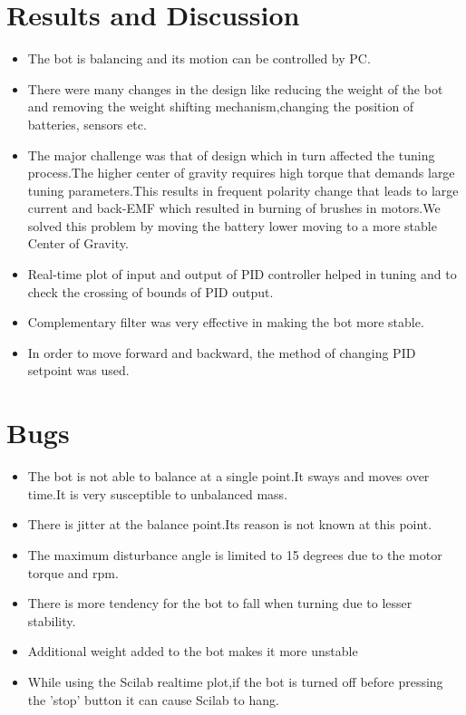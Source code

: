 \documentclass[report]{res}
\begin{document}
	
	\section{\large Results and Discussion}
	\begin{itemize}
		\item The bot is balancing and its motion can be controlled by PC.
		\item There were many changes in the design like reducing the weight of the bot and removing the weight shifting mechanism,changing the position of batteries, sensors etc.
		\item The major challenge was that of design which in turn affected the tuning process.The higher center of gravity requires high torque that demands large tuning parameters.This results in frequent polarity change that leads to large current and back-EMF which resulted in burning of brushes in motors.We solved this problem by moving the battery lower moving to a more stable Center of Gravity. 
		\item Real-time plot of input and output of PID controller helped in tuning and to check the crossing of bounds of PID output.
		\item Complementary filter was very effective in making the bot more stable.
		\item In order to move forward and backward, the method of changing PID setpoint was used.
	\end{itemize}
	
	
	\section{\large Bugs}
	\begin{itemize}
		\item The bot is not able to balance at a single point.It sways and moves over time.It is very susceptible to unbalanced mass.
		\item There is jitter at the balance point.Its reason is not known at this point.
		\item The maximum disturbance angle is limited to 15 degrees due to the motor torque and rpm.
		\item There is more tendency for the bot to fall when turning due to lesser stability. 
		\item Additional weight added to the bot makes it more unstable
		\item While using the Scilab realtime plot,if the bot is turned off before pressing the 'stop' button it can cause Scilab to hang.
	\end{itemize}
	
\end{document}
